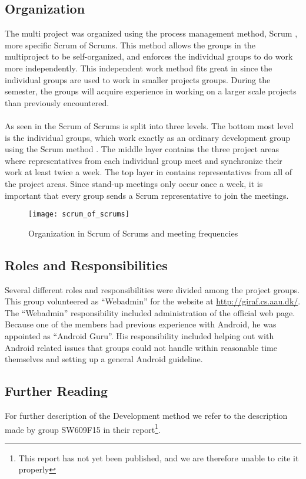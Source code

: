 \subsection{Organization}
The multi project was organized using the process management method, Scrum \parencite{scrum}, more specific Scrum of Scrums. This method allows the groups in the multiproject to be self-organized, and enforces the individual groups to do work more independently. This independent work method fits great in since the individual groups are used to work in smaller projects groups. During the semester, the groups will acquire experience in working on a larger scale projects than previously encountered.
\\\\
As seen in  the Scrum of Scrums is split into three levels. The bottom most level is the individual groups, which work exactly as an ordinary development group using the Scrum method . The middle layer contains the three project areas where representatives from each individual group meet and synchronize their work at least twice a week. The top layer in  contains representatives from all of the project areas. Since stand-up meetings only occur once a week, it is important that every group sends a Scrum representative to join the meetings.

\begin{figure}[!htbp]
  \centering
    \texttt{[image: scrum\_of\_scrums]}
    \caption{Organization in Scrum of Scrums and meeting frequencies}
    \label{fig:scrum_of_scrums}
\end{figure}

\subsection{Roles and Responsibilities}
Several different roles and responsibilities were divided among the project groups. This group volunteered as ``Webadmin'' for the website at \url{http://giraf.cs.aau.dk/}. The ``Webadmin'' responsibility included administration of the official \giraf web page. Because one of the members had previous experience with Android, he was appointed as ``Android Guru''. His responsibility included helping out with Android related issues that groups could not handle within reasonable time themselves and setting up a general Android guideline. 

\subsection{Further Reading}
For further description of the \giraf Development method we refer to the description made by group SW609F15 in their report\footnote{This report has not yet been published, and we are therefore unable to cite it properly}.